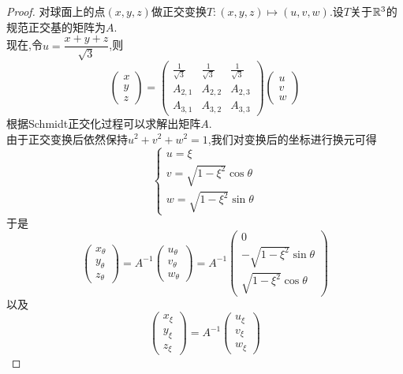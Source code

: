 \documentclass{ctexart}
\begin{document}
\begin{proof}
    对球面上的点$(x,y,z)$做正交变换$T:(x,y,z)\mapsto(u,v,w)$.设$T$关于$\mathbb{R}^3$的规范正交基的矩阵为$A$.\\
    现在,令$u=\dfrac{x+y+z}{\sqrt3}$,则
    \[\begin{pmatrix}x\\y\\z\end{pmatrix}
    =\begin{pmatrix}
        \frac{1}{\sqrt3}&\frac{1}{\sqrt3}&\frac{1}{\sqrt3}\\
        A_{2,1}&A_{2,2}&A_{2,3}\\
        A_{3,1}&A_{3,2}&A_{3,3}
    \end{pmatrix}
    \begin{pmatrix}u\\v\\w\end{pmatrix}\]
    根据Schmidt正交化过程可以求解出矩阵$A$.\\
    由于正交变换后依然保持$u^2+v^2+w^2=1$,我们对变换后的坐标进行换元可得
    \[\left\{\begin{array}{l}
        u=\xi \\
        v=\sqrt{1-\xi^2}\cos\theta \\
        w=\sqrt{1-\xi^2}\sin\theta
    \end{array}\right.\]
    于是
    \[\begin{pmatrix}x_\theta\\y_\theta\\z_\theta\end{pmatrix}
    =A^{-1}\begin{pmatrix}
        u_\theta\\v_\theta\\w_\theta
    \end{pmatrix}
    =A^{-1}\begin{pmatrix}
        0\\-\sqrt{1-\xi^2}\sin\theta\\\sqrt{1-\xi^2}\cos\theta
    \end{pmatrix}\]
    以及
    \[\begin{pmatrix}x_\xi\\y_\xi\\z_\xi\end{pmatrix}
    =A^{-1}\begin{pmatrix}
        u_\xi\\v_\xi\\w_\xi
    \end{pmatrix}
\]
\end{proof}
\end{document}
